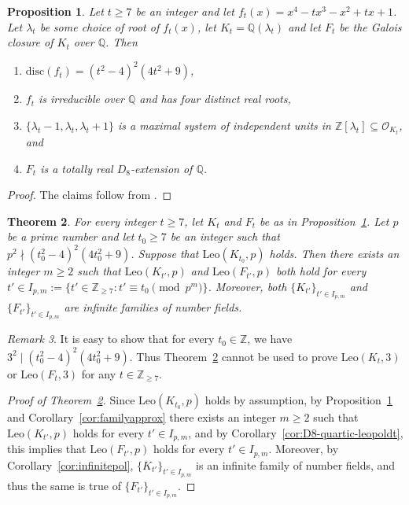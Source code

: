 \documentclass[12pt]{amsart}
\theoremstyle{plain}
\newtheorem{theorem}{Theorem}[section]
\newtheorem{prop}[theorem]{Proposition}
\theoremstyle{remark}
\newtheorem{remark}[theorem]{Remark}
\theoremstyle{definition}
\newcommand{\Z}{\mathbb{Z}}
\newcommand{\Q}{\mathbb{Q}}
\newcommand{\Leo}{\mathrm{Leo}}
\numberwithin{equation}{section}
\begin{document}
\begin{prop}{\cite{MR1378570}}\label{prop:Nakamula} 
Let $t \geq 7$ be an integer and let $f_{t}(x)=x^{4}-tx^{3}-x^{2}+tx+1$. 
Let $\lambda_{t}$ be some choice of root of $f_{t}(x)$, let $K_{t}=\Q(\lambda_{t})$ and let
$F_{t}$ be the Galois closure of $K_{t}$ over $\Q$. Then
\begin{enumerate}
\item $\mathrm{disc}(f_{t})= (t^{2}-4)^{2}(4t^{2}+9)$,
\item $f_{t}$ is irreducible over $\Q$ and has four distinct real roots,
\item $\{ \lambda_{t}-1,\lambda_{t},\lambda_{t}+1 \}$ is a maximal system of independent units in 
$\Z[\lambda_{t}] \subseteq \mathcal{O}_{K_{t}}$, and
\item $F_{t}$ is a totally real $D_{8}$-extension of $\Q$.
\end{enumerate}
\end{prop}

\begin{proof}
The claims follow from \cite[Lemma 2 and Proposition 6]{MR1378570}.
\end{proof}

\begin{theorem}\label{thm:total-real-D8}
For every integer $t \geq 7$, let $K_{t}$ and $F_{t}$ be as in Proposition~\ref{prop:Nakamula}.
Let $p$ be a prime number and let $t_{0} \geq 7$ be an integer such that 
$p^{2} \nmid (t_{0}^{2}-4)^{2}(4t_{0}^{2}+9)$. 
Suppose that $\Leo(K_{t_0},p)$ holds.
Then there exists an integer $m \geq 2$ such that $\Leo(K_{t'},p)$ and $\Leo(F_{t'},p)$ both hold for every
$t' \in I_{p,m} := \{ t' \in \Z_{\geq 7} : t'\equiv t_{0} \pmod{p^{m}} \}$. 
Moreover, both $\{K_{t'}\}_{t' \in I_{p,m}}$ and $\{F_{t'}\}_{t' \in I_{p,m}}$ are infinite families of number fields.
\end{theorem}

\begin{remark}
It is easy to show that for every $t_{0} \in \Z$, we have 
$3^{2} \mid (t_{0}^{2}-4)^{2}(4t_{0}^{2}+9)$.
Thus Theorem~\ref{thm:total-real-D8} cannot be used to prove $\Leo(K_{t},3)$ or $\Leo(F_{t},3)$ for any $t \in \Z_{\geq 7}$.
\end{remark}

\begin{proof}[Proof of Theorem~\ref{thm:total-real-D8}]
Since $\Leo(K_{t_0},p)$ holds by assumption, by 
Proposition~\ref{prop:Nakamula} and Corollary~\ref{cor:familyapprox}
there exists an integer $m \geq 2$ such that $\Leo(K_{t'},p)$ holds for every $t' \in I_{p,m}$,
and by Corollary~\ref{cor:D8-quartic-leopoldt}, this implies that 
$\Leo(F_{t'},p)$ holds for every $t' \in I_{p,m}$. 
Moreover, by Corollary~\ref{cor:infinitepol}, $\{K_{t'}\}_{t' \in I_{p,m}}$ is an infinite family of number fields, 
and thus the same is true of $\{F_{t'}\}_{t' \in I_{p,m}}$.
\end{proof}
\end{document}
